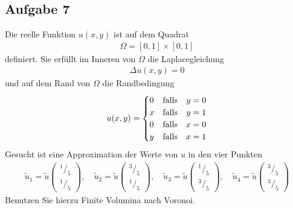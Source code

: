 \documentclass[
	final,
	a4paper,
	oneside,
	parskip=full,
	headings=standardclasses,
	headings=big,
	pointednumbers
]{scrartcl}
\begin{document}
    \subsection*{Aufgabe 7}
    Die reelle Funktion $u{\left(x,  y\right)}$ ist auf dem Quadrat
    \begin{align*}
        \Omega = \left[ 0, 1 \right] \times \left[ 0, 1 \right]
    \end{align*}
    definiert. Sie erfüllt im Inneren von $\Omega$ die Laplacegleichung
    \begin{align*}
        \Delta u{\left(x,  y\right)} = 0
    \end{align*}
    und auf dem Rand von $\Omega$ die Randbedingung
    \begin{align*}
        u{\left(x,  y\right)} =
        \setlength{\arraycolsep}{0pt}
        \renewcommand{\arraystretch}{1.2}
        \left\{
            \begin{array}{l @{\quad} l r l}
                0 & \text{falls\quad} & y &{}= 0 \\
                x & \text{falls\quad} & y &{}= 1 \\
                0 & \text{falls\quad} & x &{}= 0 \\
                y & \text{falls\quad} & x &{}= 1
            \end{array}
        \right.
    \end{align*}
    Gesucht ist eine Approximation der Werte von $u$ in den vier Punkten
    \begin{align*}
        \tilde{u}_1 = \tilde{u}{\begin{pmatrix}
            {^1/_5} \\ {^1/_5}
        \end{pmatrix}},\quad
        \tilde{u}_2 = \tilde{u}{\begin{pmatrix}
            {^3/_5} \\ {^1/_5}
        \end{pmatrix}},\quad
        \tilde{u}_3 = \tilde{u}{\begin{pmatrix}
            {^1/_5} \\ {^3/_5}
        \end{pmatrix}},\quad
        \tilde{u}_4 = \tilde{u}{\begin{pmatrix}
            {^3/_5} \\ {^3/_5}
        \end{pmatrix}}
    \end{align*}
    Benutzen Sie hierzu Finite Volumina nach Voronoi.
    
\end{document}
